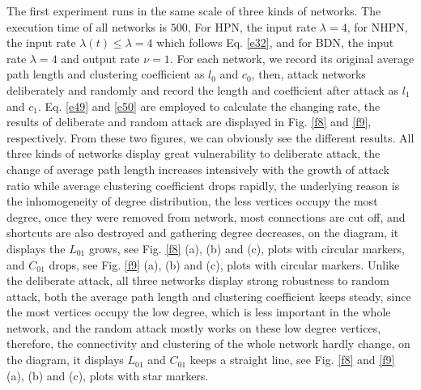 \documentclass[final]{IEEEtran}
\begin{document}
The first experiment runs in the same scale of three kinds of
networks. The execution time of all networks is $500$, For HPN,
the input rate $\lambda$$=$$4$, for NHPN, the input rate $\lambda
(t)$$ \leq$$\lambda =4$ which follows Eq. \ref{e32}, and for BDN,
the input rate $\lambda$$=$$4$ and output rate $\nu$$ =$$1$. For
each network, we record its original average path length and
clustering coefficient as $l_{0}$ and $c_{0}$, then, attack
networks deliberately and randomly and record the length and
coefficient after attack as $l_{1}$ and $c_{1}$. Eq. \ref{e49} and
\ref{e50} are employed to calculate the changing rate, the results
of deliberate and random attack are displayed in Fig. \ref{f8} and
\ref{f9}, respectively. From these two figures, we can obviously
see the different results. All three kinds of networks display
great vulnerability to deliberate attack, the change of average
path length increases intensively with the growth of attack ratio
while average clustering coefficient drops rapidly, the underlying
reason is the inhomogeneity of degree distribution, the less
vertices occupy the most degree, once they were removed from
network, most connections are cut off, and shortcuts are also
destroyed and gathering degree decreases, on the diagram, it
displays the $L_{01}$ grows, see Fig. \ref{f8} (a), (b) and (c),
plots with circular markers, and $C_{01}$ drops, see Fig. \ref{f9}
(a), (b) and (c), plots with circular markers. Unlike the
deliberate attack, all three networks display strong robustness to
random attack, both the average path length and clustering
coefficient keeps steady, since the most vertices occupy the low
degree, which is less important in the whole network, and the
random attack mostly works on these low degree vertices,
therefore, the connectivity and clustering of the whole network
hardly change, on the diagram, it displays $L_{01}$ and $C_{01}$
keeps a straight line, see Fig. \ref{f8} and \ref{f9} (a), (b) and
(c), plots with star markers.

\end{document}
